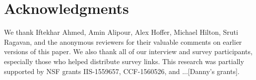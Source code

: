 \section*{Acknowledgments}

We thank Iftekhar Ahmed, Amin Alipour, Alex Hoffer, Michael Hilton, Sruti Ragavan, and the anonymous reviewers for their valuable comments on earlier versions of this paper.
We also thank all of our interview and survey participants, especially those who helped distribute survey links.
This research was partially supported by NSF grants IIS-1559657, CCF-1560526, and ...[Danny's grants].
